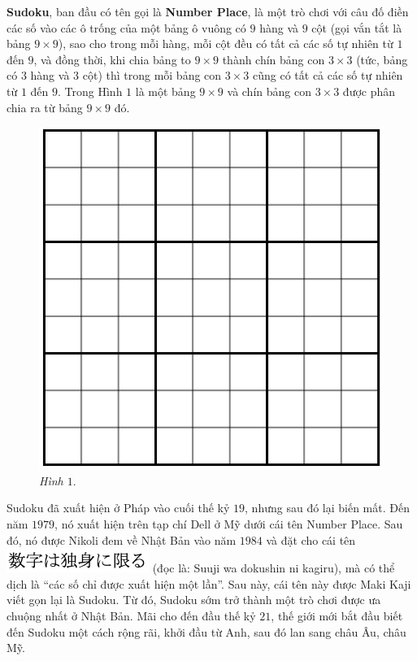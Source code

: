 	\begin{multicols}{2}
		\textbf{Sudoku}, ban đầu có tên gọi là \textbf{Number Place}, là một trò chơi với câu đố điền các số vào các ô trống của một bảng ô vuông có $9$ hàng và $9$ cột (gọi vắn tắt là bảng $9\times 9$), sao cho trong mỗi hàng, mỗi cột đều có tất cả các số tự nhiên từ $1$ đến $9$, và đồng thời, khi chia bảng to $9\times9$ thành chín bảng con $3\times 3$ (tức, bảng có $3$ hàng và $3$ cột) thì trong mỗi bảng con $3\times 3$ cũng có tất cả các số tự nhiên từ $1$ đến $9$. Trong Hình $1$ là một bảng $9\times 9$ và chín bảng con $3\times 3$ được phân chia ra từ bảng $9\times 9$ đó.
		\begin{figure}[H]
			\vspace*{-5pt}
			\centering
			\captionsetup{labelformat=empty, justification=centering}
			\includegraphics[scale=0.35]{hinh1}
			\caption{\textit{\small Hình $1.$}}
			\vspace*{-5pt}
		\end{figure}
	\end{multicols}
	Sudoku đã xuất hiện ở Pháp vào cuối thế kỷ $19$, nhưng sau đó lại biến mất. Đến năm $1979$, nó xuất hiện trên tạp chí Dell ở Mỹ dưới cái tên Number Place. Sau đó, nó được Nikoli đem về Nhật Bản vào năm $1984$ và đặt cho cái tên  \includegraphics[scale=0.4]{sudoku} (đọc là: Suuji wa dokushin ni kagiru), mà có thể dịch là “các số chỉ được xuất hiện một lần”. Sau này, cái tên này được Maki Kaji viết gọn lại là Sudoku. Từ đó, Sudoku sớm trở thành một trò chơi được ưa chuộng nhất ở Nhật Bản. Mãi cho đến đầu thế kỷ $21$, thế giới mới bắt đầu biết đến Sudoku một cách rộng rãi, khởi đầu từ Anh, sau đó lan sang châu Âu, châu Mỹ.
